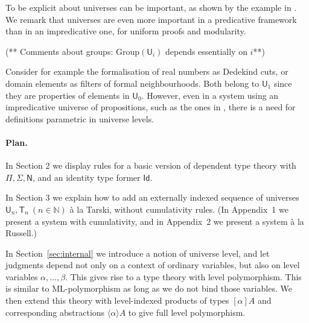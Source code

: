 \documentclass[11pt,a4paper]{article}
\theoremstyle{definition}
\newcommand{\Id}{\mathsf{Id}}
\newcommand{\NN}{\mathsf{N}}
\newcommand{\Nat}{\mathbb{N}}
\newcommand{\UU}{\mathsf{U}}
\newcommand{\Level}{\mathsf{level}}
\newcommand{\lam}[1]{{\langle}#1{\rangle}}
\newcommand{\T}{\mathsf{T}}
\begin{document}
To be explicit about universes can be important, as shown by the
example in \cite{chambert-loir:universes-matter,waterhouse:sheaves}.
We remark that universes are even more important in a predicative framework 
than in an impredicative one, for uniform proofs and modularity.

(** Comments about groups: Group$(\UU_i)$ depends essentially on $i$**)


Consider for example the formalisation of real numbers as Dedekind cuts, 
or domain elements as filters of formal neighbourhoods. Both belong to $\UU_1$ since they are properties of elements in $\UU_0$.
However, even in a system using an impredicative universe of propositions,
such as the ones in \cite{Huet87,moura:lean}, there is a need for 
definitions parametric in universe levels.




\paragraph{Plan.} 
In Section 2 we display rules for a basic version of dependent type theory with
$\Pi, \Sigma, \NN$, and an identity type former $\Id$.

In Section 3 we explain how to add an externally indexed sequence of universes 
$\UU_n, \T_n~(n\in\Nat)$ \`a la Tarski, without cumulativity rules. 
(In Appendix~1 we present a system with cumulativity,
and in Appendix~2 we present a system \`a la Russell.)

In Section~\ref{sec:internal} we introduce a notion of universe level, 
and let judgments depend not only on a context of ordinary variables, 
but also on level variables $\alpha, \ldots, \beta$. 
This gives rise to a type theory with level polymorphism. 
This is similar to ML-polymorphism as long as we do not bind those variables.
We then extend this theory with level-indexed products of 
types $[\alpha]A$ and corresponding abstractions $\lam{\alpha}A$
to give full level polymorphism.
\end{document}
